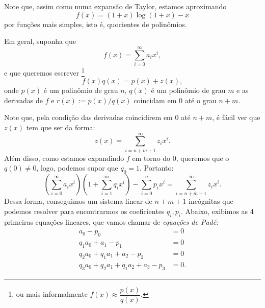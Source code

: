 \documentclass[12pt,a4paper,oneside]{book}
\theoremstyle{definition}
\theoremstyle{remark}
\numberwithin{equation}{section}
\begin{document}
Note que, assim como numa expansão de Taylor, estamos aproximando 
$$f(x)=(1+x)\log(1+x)-x$$ por funções mais simples, isto é, quocientes de polinômios.

Em geral, suponha que
$$f(x) = \sum_{i=0}^\infty a_ix^i ,$$
e que queremos escrever \footnote{ou mais informalmente
$f(x)\approx \dfrac{p(x)}{q(x)}. $}
$$f(x)q(x) = p(x) + z(x) , $$
onde $p(x)$ é um polinômio de grau $n$, $q(x)$ é um polinômio de grau $m$ e as derivadas de $f$ e  $r(x):=p(x)/q(x)$ coincidam em $0$ até o grau $n+m$.

Note que, pela condição das derivadas coincidirem em $0$ até  $n+m$, é fácil ver que $z(x)$ tem que ser da forma:
$$z(x) = \sum_{i=n+m+1}^\infty z_ix^i. $$
Além disso, como estamos expandindo $f$ em torno do $0$, queremos que o $q(0)\neq 0$, logo, podemos supor que $q_0=1$. Portanto: 
$$\left(\sum_{i=0}^\infty a_ix^i \right)\left(1+\sum_{i=1}^m q_ix^i\right) -\sum_{i=0}^n p_ix^i =  \sum_{i=n+m+1}^\infty z_ix^i.$$ 
Dessa forma, conseguimos um sistema linear de $n+m+1$ incógnitas que podemos resolver para encontrarmos os coeficientes $q_i,p_i$. Abaixo, exibimos as 4 primeiras equações lineares, que vamos chamar de \emph{equações de Padé}:
\begin{align*}\label{pade}
a_0-p_0&=0\\
q_1a_0+a_1-p_1&=0\\
q_2a_0+q_1a_1+a_2-p_2 &= 0\\
q_3a_0+q_2a_1+q_1a_2+a_3-p_3&=0.
\end{align*}
\end{document}
